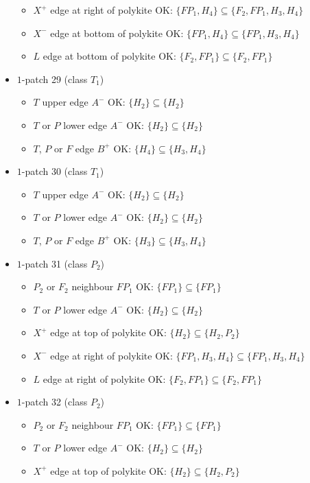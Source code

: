 \begin{itemize}
\begin{itemize}
\item $X^+$ edge at right of polykite OK: $\{FP_1, H_4\} \subseteq \{F_2, FP_1, H_3, H_4\}$
\item $X^-$ edge at bottom of polykite OK: $\{FP_1, H_4\} \subseteq \{FP_1, H_3, H_4\}$
\item $L$ edge at bottom of polykite OK: $\{F_2, FP_1\} \subseteq \{F_2, FP_1\}$
\end{itemize}
\item $1$-patch 29 (class $T_1$)
\begin{itemize}
\item $T$ upper edge $A^-$ OK: $\{H_2\} \subseteq \{H_2\}$
\item $T$ or $P$ lower edge $A^-$ OK: $\{H_2\} \subseteq \{H_2\}$
\item $T$, $P$ or $F$ edge $B^+$ OK: $\{H_4\} \subseteq \{H_3, H_4\}$
\end{itemize}
\item $1$-patch 30 (class $T_1$)
\begin{itemize}
\item $T$ upper edge $A^-$ OK: $\{H_2\} \subseteq \{H_2\}$
\item $T$ or $P$ lower edge $A^-$ OK: $\{H_2\} \subseteq \{H_2\}$
\item $T$, $P$ or $F$ edge $B^+$ OK: $\{H_3\} \subseteq \{H_3, H_4\}$
\end{itemize}
\item $1$-patch 31 (class $P_2$)
\begin{itemize}
\item $P_2$ or $F_2$ neighbour $FP_1$ OK: $\{FP_1\} \subseteq \{FP_1\}$
\item $T$ or $P$ lower edge $A^-$ OK: $\{H_2\} \subseteq \{H_2\}$
\item $X^+$ edge at top of polykite OK: $\{H_2\} \subseteq \{H_2, P_2\}$
\item $X^-$ edge at right of polykite OK: $\{FP_1, H_3, H_4\} \subseteq \{FP_1, H_3, H_4\}$
\item $L$ edge at right of polykite OK: $\{F_2, FP_1\} \subseteq \{F_2, FP_1\}$
\end{itemize}
\item $1$-patch 32 (class $P_2$)
\begin{itemize}
\item $P_2$ or $F_2$ neighbour $FP_1$ OK: $\{FP_1\} \subseteq \{FP_1\}$
\item $T$ or $P$ lower edge $A^-$ OK: $\{H_2\} \subseteq \{H_2\}$
\item $X^+$ edge at top of polykite OK: $\{H_2\} \subseteq \{H_2, P_2\}$

\end{itemize}
\end{itemize}
